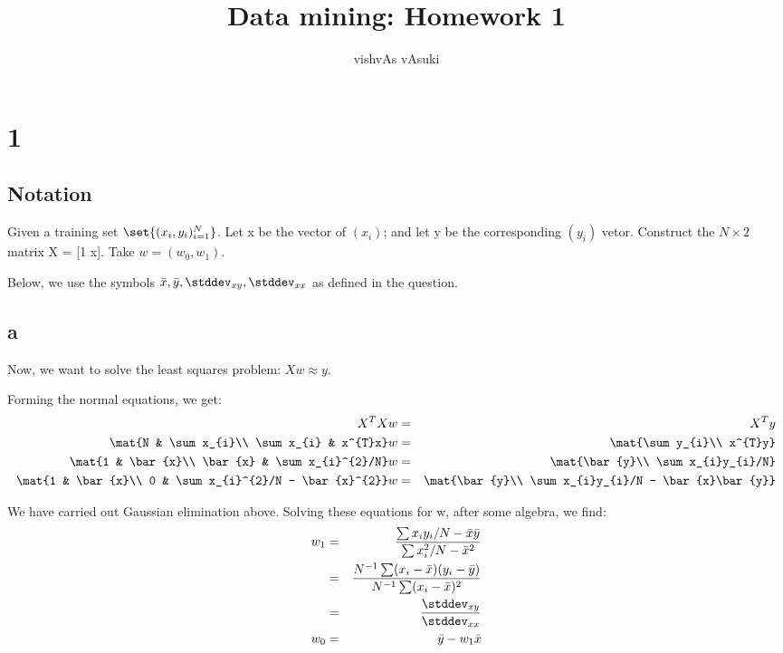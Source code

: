\documentclass{article}
\title{Data mining: Homework 1}
\author{vishvAs vAsuki}
\begin{document}
\maketitle

\section{1}
\subsection{Notation}
Given a training set $\set{(x_{i}, y_{i})_{i=1}^{N}}$. Let x be the vector of $(x_{i})$; and let y be the corresponding $(y_{i})$ vetor. Construct the $N \times 2$ matrix X = [1 x]. Take $w = (w_{0}, w_{1})$.

Below, we use the symbols $\bar{x}, \bar{y}, \stddev_{xy}, \stddev_{xx}$ as defined in the question.

\subsection{a}
Now, we want to solve the least squares problem: $Xw \approx y$.

Forming the normal equations, we get:
\begin{eqnarray*}
X^{T}Xw &=& X^{T}y\\
\mat{N & \sum x_{i}\\ \sum x_{i} & x^{T}x}w &=& \mat{\sum y_{i}\\ x^{T}y}\\
\mat{1 & \bar{x}\\ \bar{x} & \sum x_{i}^{2}/N}w &=& \mat{\bar{y}\\ \sum x_{i}y_{i}/N}\\
\mat{1 & \bar{x}\\ 0 & \sum x_{i}^{2}/N - \bar{x}^{2}}w &=& \mat{\bar{y}\\ \sum x_{i}y_{i}/N - \bar{x}\bar{y}}\\
\end{eqnarray*}

We have carried out Gaussian elimination above. Solving these equations for w, after some algebra, we find:
\begin{eqnarray*}
w_{1} &=& \frac{\sum x_{i}y_{i}/N - \bar{x}\bar{y}}{\sum x_{i}^{2}/N - \bar{x}^{2}}\\
&=& \frac{N^{-1}\sum(x_{i}-\bar{x})(y_{i}-\bar{y})}{N^{-1}\sum(x_{i}-\bar{x})^{2}}\\
&=& \frac{\stddev_{xy}}{\stddev_{xx}}\\
w_{0} &=& \bar{y} - w_{1}\bar{x}\\
\end{eqnarray*}
\end{document}
